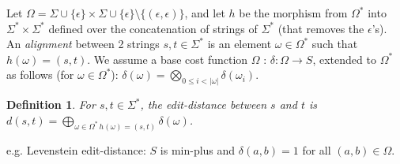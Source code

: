 \documentclass[a4paper,11pt]{article}
\newtheorem{definition}[theorem]{Definition}
\begin{document}
Let $\Omega = \Sigma \cup \{ \epsilon \} \times \Sigma \cup \{ \epsilon \} \setminus \{ (\epsilon, \epsilon) \}$,
and let $h$ be the morphism from $\Omega^*$ into $\Sigma^* \times \Sigma^*$  
defined over the concatenation of strings of $\Sigma^*$ (that removes the $\epsilon$'s).
%
\noindent
An \emph{alignment} between 2 strings  $s, t \in \Sigma^*$ is an element $\omega \in \Omega^*$ 
such that $h(\omega) = (s, t)$.
%
\noindent
We assume a base cost function $\Omega$ : $\delta: \Omega \to S$, extended to $\Omega^*$ as follows  
(for $\omega \in \Omega^*$): 
\(
\displaystyle\delta(\omega) = \bigotimes_{0 \leq i < |\omega|} \delta(\omega_i)
\).

\noindent
\begin{definition}
For  $s, t \in \Sigma^*$, the edit-distance between $s$ and $t$ is  
\( 
d(s, t) = \displaystyle\bigoplus_{\omega \in \Omega^*\, h(\omega) = (s, t)} \delta(\omega)
\).
\end{definition}

e.g. Levenstein edit-distance: $S$ is min-plus and $\delta(a, b) = 1$ for all $(a, b) \in \Omega$.


\end{document}
